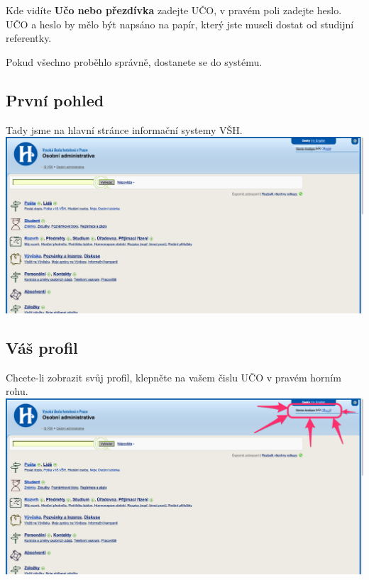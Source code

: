 \documentclass[a4paper,12pt]{article}
\begin{document}
Kde vidíte \textbf{Učo nebo přezdívka} zadejte UČO, v pravém poli zadejte heslo. 
UČO a heslo by mělo být napsáno na papír, který jste museli dostat od studijní referentky.

Pokud všechno proběhlo správně, dostanete se do systému.

\subsection{První pohled}
Tady jsme na hlavní stránce informační systemy VŠH. \\

\includegraphics[width=\textwidth]{s04} \\


\newpage
\subsection{Váš profil}

Chcete-li zobrazit svůj profil, klepněte na vašem čislu UČO v pravém horním rohu. \\

\includegraphics[width=\textwidth]{s05} \\
\end{document}
